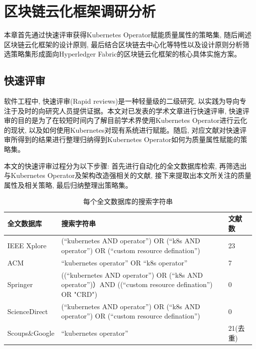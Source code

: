 \chapter{区块链云化框架调研分析}

本章首先通过快速评审获得Kubernetes Operator赋能质量属性的策略集,  随后阐述区块链云化框架的设计原则, 最后结合区块链去中心化等特性以及设计原则分析筛选策略集形成面向Hyperledger Fabric的区块链云化框架的核心具体实施方案。

\section{快速评审}\label{section: rapid_reviews}

软件工程中, 快速评审(Rapid reviews)是一种轻量级的二级研究, 以实践为导向专注于及时的向研究人员提供证据\cite{cartaxo2020rapid}。本文对已发表的学术文章进行快速评审, 快速评审的目的是为了在较短时间内了解目前学术界使用Kubernetes Operator进行云化的现状, 以及如何使用Kubernetes对现有系统进行赋能。随后, 对应文献对快速评审所得到的结果进行整理归纳得到Kubernetes Operator如何为质量属性赋能的策略集。

本文的快速评审过程分为以下步骤: 首先进行自动化的全文数据库检索, 再筛选出与Kubernetes Operator及架构改造强相关的文献, 接下来提取出本文所关注的质量属性及相关策略, 最后归纳整理出策略集。

{\footnotesize
\begin{longtable}[h]{m{60pt} m{210pt} m{40pt}<{\centering}}
    \caption[每个全文数据库的搜索字符串]{每个全文数据库的搜索字符串} \label{search_string} \\
        \toprule  
        \textbf{全文数据库}&\textbf{搜索字符串}&\textbf{文献数}\\
        \hline
        IEEE Xplore &(“kubernetes AND operator”) OR (“k8s AND operator”) OR (“custom resource defination”) & 23 \\

        ACM & “kubernetes operator” OR “k8s operator” & 7 \\

        Springer &((“kubernetes AND operator”) OR (“k8s AND operator”)）AND ((“custom resource defination”) OR "CRD") & 0 \\

        ScienceDirect &(“kubernetes AND operator”) OR (“k8s AND operator”) OR (“custom resource defination”) & 0 \\
        \hline
        Scoups\&Google &“kubernetes operator”& 21(去重) \\
        \bottomrule
    \end{longtable}
}

